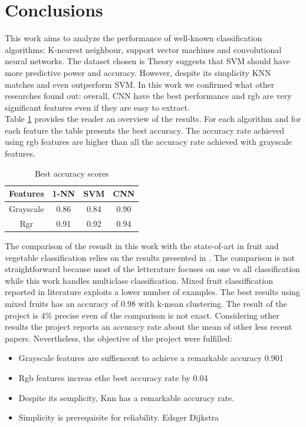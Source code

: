\documentclass{article}
\begin{document}
\section{Conclusions}
This work aims to analyze the performance of well-known classification algorithms: K-nearest neighbour, support vector machines and convolutional neural networks. The dataset chosen is
Theory suggests that SVM should have more predictive power and accuracy. However, despite its simplicity KNN matches and even outperform SVM. In this work we confirmed what other researches found out: overall, CNN have the best performance and rgb are very significant features even if they are easy to extract.  \\
Table \ref{results} provides the reader an overview of the results. For each algorithm and for each feature the table presents the best accuracy.
The accuracy rate achieved using rgb features are higher than all the accuracy rate achieved with grayscale features. \\
\begin{table}[H] \label{results}
\centering
 \begin{tabular}{|c|c|c|c|} 
 \hline
  Features & 1-NN & SVM & CNN\\
 \hline
 Grayscale&0.86&0.84&0.90 \\
 \hline
 Rgr&0.91& 0.92 & 0.94  \\
 \hline
\end{tabular}
\caption{Best accuracy scores}
\end{table}

\noindent The comparison of the resuslt in this work with the state-of-art in fruit and vegetable classification relies on the results presented in \cite{review}. The comparison is not straightforward because most of the letterature focuses on one vs all classification while this work handles multiclass classification. Mixed fruit classiffication reported in literature  exploits a lower number of examples. The best results using mixed fruits has an accuracy of 0.98 with k-mean clustering. The result of the project is 4\% precise even of the comparison is not exact. 
Considering other results the project reports an accuracy rate about the mean of other less recent papers.
Nevertheless, the objective of the project were fulfilled:
\begin{itemize}
\item Grayscale features are suffiencent to achieve a remarkable accuracy 0.901
\item Rgb features increas ethe best accuracy rate by 0.04
\item Despite its semplicity, Knn has a remarkable accuracy rate. 
\item Simplicity is prerequisite for reliability. Edsger Dijkstra
\end{itemize}
\end{document}
